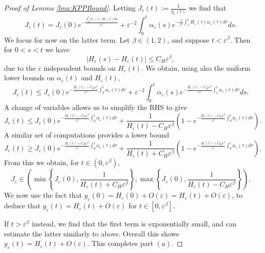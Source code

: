 \documentclass[10pt,a4paper]{amsart}
\begin{document}
\begin{proof}[Proof of Lemma \ref{lma:KPPBound}]
Letting $J_\varepsilon(t):=\frac{1}{y_\varepsilon(t)}$ we find that 
\[J_\varepsilon(t)=J_\varepsilon(0)e^{-\frac{\int_{0}^{t}\alpha_\varepsilon(s)H_\varepsilon(s)ds}{\varepsilon^2}}+\varepsilon^{-2}\int_{0}^{t}\alpha_{\varepsilon}(s)e^{-\frac{1}{\varepsilon^2}\int_{s}^{t}H_\varepsilon(\tau)\alpha_\varepsilon(\tau)d\tau}ds.\]
We focus for now on the latter term. Let $\beta\in(1,2)$, and suppose $t<\varepsilon^\beta$. Then for $0<s<t$ we have
\[|H_\varepsilon(s)-H_\varepsilon(t)|\leq{}C_H{}\varepsilon^\beta,\]
 due to the $\varepsilon$ independent bounds on $H_\varepsilon(t)$. We obtain, using also the uniform lower bounds on $\alpha_\varepsilon(t)$ and $H_\varepsilon(t)$,
\[J_\varepsilon(t)\leq{}J_\varepsilon
(0)e^{-\frac{H_\varepsilon(t)-C_H\varepsilon^\beta}{\varepsilon^2}\int_{0}^{t}\alpha_\varepsilon(\tau)d\tau}+\varepsilon^{-2}\int_{0}^{t}\alpha_\varepsilon(s)e^{-\frac{H_\varepsilon(t)-C_H\varepsilon^\beta}{\varepsilon^2}\int_{s}^{t}\alpha_\varepsilon(\tau)d\tau}ds.\]
A change of variables allows us to simplify the RHS to give 
\[J_\varepsilon(t)\leq{}J_\varepsilon
(0)e^{-\frac{H_\varepsilon(t)-C_H\varepsilon^\beta}{\varepsilon^2}\int_{0}^{t}\alpha_\varepsilon(\tau)d\tau}+\frac{1}{H_\varepsilon(t)-C_H\varepsilon^\beta}\left(1-e^{-\frac{H_\varepsilon(t)-C_H\varepsilon^\beta}{\varepsilon^2}\int_{0}^{t}\alpha_\varepsilon(\tau)d\tau}\right).\]
A similar set of computations provides a lower bound
\[J_\varepsilon(t)\geq{}J_\varepsilon
(0)e^{-\frac{H_\varepsilon(t)+C_H\varepsilon^\beta}{\varepsilon^2}\int_{0}^{t}\alpha_\varepsilon(\tau)d\tau}+\frac{1}{H_\varepsilon(t)+C_H\varepsilon^\beta}\left(1-e^{-\frac{H_\varepsilon(t)+C_H\varepsilon^\beta}{\varepsilon^2}\int_{0}^{t}\alpha_\varepsilon(\tau)d\tau}\right).\]
From this we obtain, for $t\in(0,\varepsilon^\beta)$, \[J_\varepsilon\in\left(\min\left\{J_\varepsilon(0),\frac{1}{H_\varepsilon(t)+C_H\varepsilon^\beta}\right\},\max\left\{J_\varepsilon(0),\frac{1}{H_\varepsilon(t)-C_H\varepsilon^\beta}\right\}\right).\]
We now use the fact that $y_\varepsilon(0)=H_\varepsilon(0)+O(\varepsilon)=H_\varepsilon(t)+O(\varepsilon)$, to deduce that $y_\varepsilon(t)=H_\varepsilon(t)+O(\varepsilon)$ for $t\in[0,\varepsilon^\beta].$


If $t>\varepsilon^\beta$ instead, we find that the first term is exponentially small, and can estimate the latter similarly to above. Overall this shows $y_\varepsilon(t)=H_\varepsilon(t)+O(\varepsilon)$. This completes part $(a)$. 


\end{proof}
\end{document}
